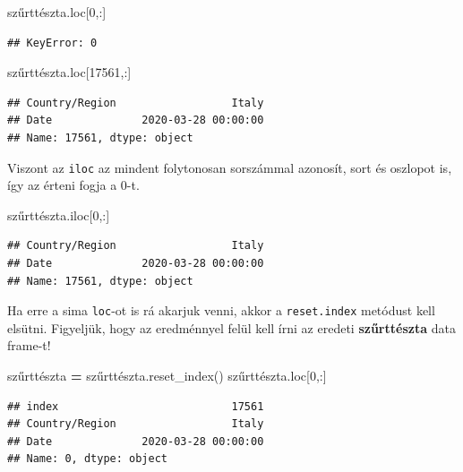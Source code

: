 \documentclass[
]{book}
\newenvironment{Shaded}{\begin{snugshade}}{\end{snugshade}}
\newcommand{\DecValTok}[1]{\textcolor[rgb]{0.00,0.00,0.81}{#1}}
\newcommand{\NormalTok}[1]{#1}
\newcommand{\OperatorTok}[1]{\textcolor[rgb]{0.81,0.36,0.00}{\textbf{#1}}}
\begin{document}
\begin{Shaded}
\begin{Highlighting}[]
\NormalTok{szűrttészta.loc[}\DecValTok{0}\NormalTok{,:]}
\end{Highlighting}
\end{Shaded}

\begin{verbatim}
## KeyError: 0
\end{verbatim}

\begin{Shaded}
\begin{Highlighting}[]
\NormalTok{szűrttészta.loc[}\DecValTok{17561}\NormalTok{,:]}
\end{Highlighting}
\end{Shaded}

\begin{verbatim}
## Country/Region                  Italy
## Date              2020-03-28 00:00:00
## Name: 17561, dtype: object
\end{verbatim}

Viszont az \texttt{iloc} az mindent folytonosan sorszámmal azonosít, sort és oszlopot is, így az érteni fogja a \(0\)-t.

\begin{Shaded}
\begin{Highlighting}[]
\NormalTok{szűrttészta.iloc[}\DecValTok{0}\NormalTok{,:]}
\end{Highlighting}
\end{Shaded}

\begin{verbatim}
## Country/Region                  Italy
## Date              2020-03-28 00:00:00
## Name: 17561, dtype: object
\end{verbatim}

Ha erre a sima \texttt{loc}-ot is rá akarjuk venni, akkor a \texttt{reset.index} metódust kell elsütni. Figyeljük, hogy az eredménnyel felül kell írni az eredeti \textbf{szűrttészta} data frame-t!

\begin{Shaded}
\begin{Highlighting}[]
\NormalTok{szűrttészta }\OperatorTok{=}\NormalTok{ szűrttészta.reset\_index()}
\NormalTok{szűrttészta.loc[}\DecValTok{0}\NormalTok{,:]}
\end{Highlighting}
\end{Shaded}

\begin{verbatim}
## index                           17561
## Country/Region                  Italy
## Date              2020-03-28 00:00:00
## Name: 0, dtype: object
\end{verbatim}
\end{document}
